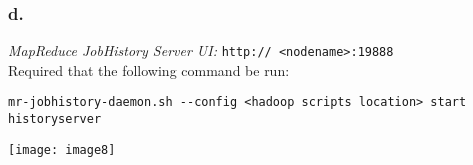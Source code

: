 \documentclass[]{article}
\begin{document}
\subsubsection*{d.}
\emph{MapReduce JobHistory Server UI: }
\texttt{http:// <nodename>:19888} \\
Required that the following command be run: \vspace{-1.5em} \\
\begin{verbatim}
mr-jobhistory-daemon.sh --config <hadoop scripts location> start historyserver
\end{verbatim}
\texttt{[image: image8]} \vspace{-1.5em}
\end{document}
